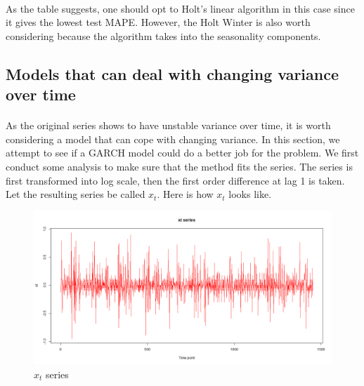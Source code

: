 \documentclass[12pt]{article}
\begin{document}
\paragraph{}
As the table suggests, one should opt to Holt's linear algorithm in this case since it gives the lowest test MAPE. However, the Holt Winter is also worth considering because the algorithm takes into the seasonality components. 

\subsection{Models that can deal with changing variance over time}
\paragraph{}
As the original series shows to have unstable variance over time, it is worth considering a model that can cope with changing variance. In this section, we attempt to see if a GARCH model could do a better job for the problem. We first conduct some analysis to make sure that the method fits the series. The series is first transformed into log scale, then the first order difference at lag 1 is taken. Let the resulting series be called $x_t$. Here is how $x_t$ looks like.
\begin{figure}[H]
  \centering
  \includegraphics[width=\linewidth]{figure24.png}
  \caption{$x_t$ series}
  \label{fig:figure25}
\end{figure}
\end{document}
